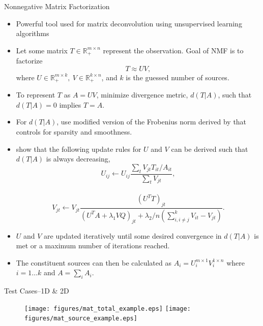 \documentclass[final]{beamer}
\begin{document}
\begin{frame}{}
\begin{columns}[t]
\begin{column}{.32\linewidth}
\begin{block}{Nonnegative Matrix Factorization}
			\begin{itemize}
				\item Powerful tool used for matrix deconvolution using \alert{unsupervised learning algorithms}
				\item Let some matrix $T\in\mathbb{R}_+^{m\times n}$ represent the observation. Goal of NMF is to factorize $$T\approx UV,$$where $U\in\mathbb{R}_+^{m\times k},~V\in\mathbb{R}_+^{k\times n}$, and $k$ is the guessed number of sources.
				\item To represent $T$ as $A=UV$, minimize divergence metric, $d(T|A)$, such that $d(T|A) = 0$ implies $T=A$. 
				 \item For $d(T|A)$, use modified version of the Frobenius norm derived by \citet{chen_nonnegative_2005} that controls for sparsity and smoothness.
				 \item \citet{chen_nonnegative_2005} show that the following update rules for $U$ and $V$ can be derived such that $d(T|A)$ is always decreasing,
				 $$U_{ij}\gets U_{ij}\frac{\sum_tV_{jt}T_{it}/A_{it}}{\sum_tV_{jt}},$$
				 \\
				 $$V_{jt}\gets V_{jt}\frac{(U^TT)_{jt}}{(U^TA + \lambda_1VQ)_{jt} + \lambda_2/n(\sum_{i,i\neq j}^kV_{it} - V_{jt})}.$$
				 \item $U$ and $V$ are updated iteratively until some desired convergence in $d(T|A)$ is met or a maximum number of iterations reached.
				 \item The constituent sources can then be calculated as $A_i=U_i^{m\times 1}V_i^{1\times n}$ where $i=1\ldots k$ and $A=\sum_iA_i$.
			\end{itemize}
        \end{block}
        \begin{block}{Test Cases--1D \& 2D}
			\begin{figure}
				\texttt{[image: figures/mat\_total\_example.eps]}
				\texttt{[image: figures/mat\_source\_example.eps]}

\end{figure}
\end{block}
\end{column}
\end{columns}
\end{frame}
\end{document}
